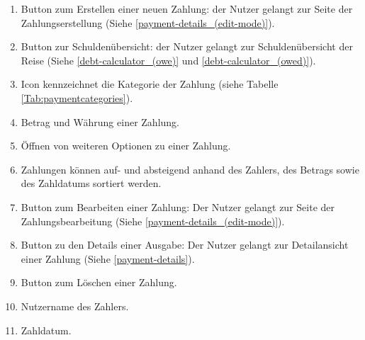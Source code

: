 \begin{enumerate}[label=\protect\circled{\arabic*}]
	\item Button zum Erstellen einer neuen Zahlung: der Nutzer gelangt zur Seite der Zahlungserstellung (Siehe \ref{payment-details_(edit-mode)}).
	\item Button zur Schuldenübersicht: der Nutzer gelangt zur Schuldenübersicht der Reise (Siehe \ref{debt-calculator_(owe)} und \ref{debt-calculator_(owed)}).
	\item Icon kennzeichnet die Kategorie der Zahlung (siehe Tabelle \ref{Tab:paymentcategories}).
	\item Betrag und Währung einer Zahlung.
	\item Öffnen von weiteren Optionen zu einer Zahlung.
	\item Zahlungen können auf- und absteigend anhand des Zahlers, des Betrags sowie des Zahldatums sortiert werden.
	\item Button zum Bearbeiten einer Zahlung: Der Nutzer gelangt zur Seite der Zahlungsbearbeitung  (Siehe \ref{payment-details_(edit-mode)}).
	\item Button zu den Details einer Ausgabe: Der Nutzer gelangt zur Detailansicht einer Zahlung  (Siehe \ref{payment-details}).
	\item Button zum Löschen einer Zahlung.
	\item Nutzername des Zahlers.
	\item Zahldatum.
\end{enumerate}

